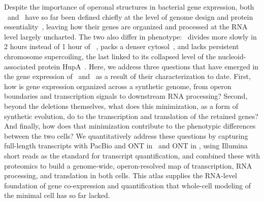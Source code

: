 Despite the importance of operonal structures in bacterial gene expression, both \syn~and \syna~have so far been defined chiefly at the level of genome design and protein essentiality~\cite{breuer_essential_2019}, leaving how their genes are organized and processed at the RNA level largely uncharted.
The two also differ in phenotype: \syna~divides more slowly in 2 hours instead of 1 hour of \syn~\cite{pelletier_genetic_2021}, packs a denser cytosol~\cite{gilbert_generating_2021}, and lacks persistent chromosome supercoiling, the last linked to its collapsed level of the nucleoid-associated protein HupA~\cite{gilbert_generating_2021}.
Here, we address three questions that have emerged in the gene expression of \syn~and \syna~as a result of their characterization to date.
First, how is gene expression organized across a synthetic genome, from operon boundaries and transcription signals to downstream RNA processing?
Second, beyond the deletions themselves, what does this minimization, as a form of synthetic evolution, do to the transcription and translation of the retained genes?
And finally, how does that minimization contribute to the phenotypic differences between the two cells? 
We quantitatively address these questions by capturing full-length transcripts with PacBio and ONT in \syn~and ONT in \syna, using Illumina short reads as the standard for transcript quantification, and combined these with proteomics to build a genome-wide, operon-resolved map of transcription, RNA processing, and translation in both cells.
This atlas supplies the RNA-level foundation of gene co-expression and quantification that whole-cell modeling of the minimal cell has so far lacked.

